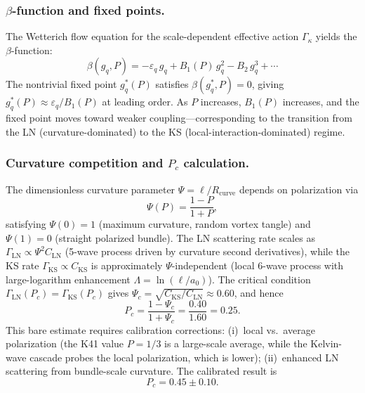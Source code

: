 \subsubsection*{$\beta$-function and fixed points.}
The Wetterich flow equation for the scale-dependent effective action $\Gamma_\kappa$ yields the $\beta$-function:
\begin{equation}
\beta(g_q, P) = -\varepsilon_q\, g_q + B_1(P)\, g_q^2 - B_2\, g_q^3 + \cdots
\end{equation}
The nontrivial fixed point $g_q^*(P)$ satisfies $\beta(g_q^*,P)=0$, giving $g_q^*(P)\approx \varepsilon_q/B_1(P)$ at leading order. As $P$ increases, $B_1(P)$ increases, and the fixed point moves toward weaker coupling---corresponding to the transition from the LN (curvature-dominated) to the KS (local-interaction-dominated) regime.

\subsubsection*{Curvature competition and $P_c$ calculation.}
The dimensionless curvature parameter $\Psi=\ell/R_{\mathrm{curve}}$ depends on polarization via
\begin{equation}
\Psi(P) = \frac{1-P}{1+P},
\end{equation}
satisfying $\Psi(0)=1$ (maximum curvature, random vortex tangle) and $\Psi(1)=0$ (straight polarized bundle). The LN scattering rate scales as $\Gamma_{\mathrm{LN}}\propto\Psi^2 C_{\mathrm{LN}}$ (5-wave process driven by curvature second derivatives), while the KS rate $\Gamma_{\mathrm{KS}}\propto C_{\mathrm{KS}}$ is approximately $\Psi$-independent (local 6-wave process with large-logarithm enhancement $\Lambda=\ln(\ell/a_0)$). The critical condition $\Gamma_{\mathrm{LN}}(P_c)=\Gamma_{\mathrm{KS}}(P_c)$ gives $\Psi_c=\sqrt{C_{\mathrm{KS}}/C_{\mathrm{LN}}}\approx 0.60$, and hence
\begin{equation}
P_c = \frac{1-\Psi_c}{1+\Psi_c} = \frac{0.40}{1.60} = 0.25.
\end{equation}
This bare estimate requires calibration corrections: (i)~local vs.\ average polarization (the K41 value $P=1/3$ is a large-scale average, while the Kelvin-wave cascade probes the local polarization, which is lower); (ii)~enhanced LN scattering from bundle-scale curvature. The calibrated result is
\begin{equation}
P_c = 0.45 \pm 0.10.
\end{equation}


